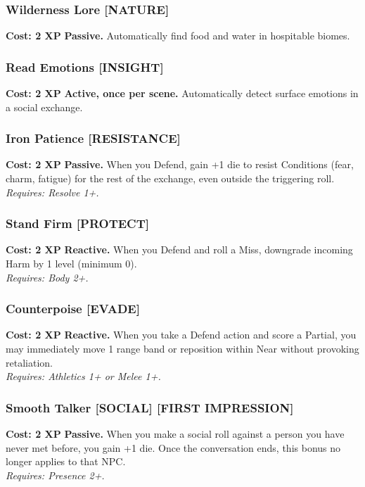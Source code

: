 \documentclass[12pt,a4paper]{book}
\begin{document}
\subsubsection*{Wilderness Lore \textnormal{[NATURE]}}
\label{talent:wilderness-lore}
\textbf{Cost: 2 XP} \textbf{Passive.} Automatically find food and water in hospitable biomes.

\subsubsection*{Read Emotions \textnormal{[INSIGHT]}}
\label{talent:read-emotions}
\textbf{Cost: 2 XP} \textbf{Active, once per scene.} Automatically detect surface emotions in a social exchange.

\subsubsection*{Iron Patience \textnormal{[RESISTANCE]}}
\label{talent:iron-patience}
\textbf{Cost: 2 XP} \textbf{Passive.} When you Defend, gain +1 die to resist Conditions (fear, charm, fatigue) for the rest of the exchange, even outside the triggering roll. \\
\textit{Requires: Resolve 1+.}

\subsubsection*{Stand Firm \textnormal{[PROTECT]}}
\label{talent:stand-firm}
\textbf{Cost: 2 XP} \textbf{Reactive.} When you Defend and roll a Miss, downgrade incoming Harm by 1 level (minimum 0). \\
\textit{Requires: Body 2+.}

\subsubsection*{Counterpoise \textnormal{[EVADE]}}
\label{talent:counterpoise}
\textbf{Cost: 2 XP} \textbf{Reactive.} When you take a Defend action and score a Partial, you may immediately move 1 range band or reposition within Near without provoking retaliation. \\
\textit{Requires: Athletics 1+ or Melee 1+.}

\subsubsection*{Smooth Talker \textnormal{[SOCIAL] [FIRST IMPRESSION]}}
\label{talent:smooth-talker}
\textbf{Cost: 2 XP} \textbf{Passive.} When you make a social roll against a person you have never met before, you gain +1 die. Once the conversation ends, this bonus no longer applies to that NPC. \\
\textit{Requires: Presence 2+.}
\end{document}
